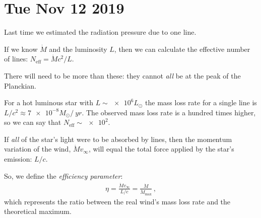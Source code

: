 \documentclass[main.tex]{subfiles}
\begin{document}
\section*{Tue Nov 12 2019}

Last time we estimated the radiation pressure due to one line.

If we know \(\dot{M} \) and the luminosity \(L\), then we can calculate the effective number of  lines: \(N _{\text{eff}} = \dot{M} c^2 / L\).

\begin{bluebox}
There will need to be more than these: they cannot \emph{all} be at the peak of the Planckian. 
\end{bluebox}

For a hot luminous star with \(L \sim \num{e6} L_{\odot}\) the mass loss rate for a single line is \(L/c^2 \approx \num{7e-8} M_{\odot} / \SI{}{yr}\).
The observed mass loss rate is a hundred times higher, so we can say that \(N  _{\text{eff}} \sim \num{e2}\).

If \emph{all} of the star's light were to be absorbed by lines, then the momentum variation of the wind, \(\dot{M} v_{ \infty }\), will equal the total force applied by the star's emission: \(L/c\). 


So, we define the \emph{efficiency parameter}: 
%
\begin{align}
  \eta = \frac{\dot{M} v_{\infty}}{L / c} = \frac{\dot{M}}{\dot{M} _{\text{max}}}
\,,
\end{align}
%
which represents the ratio between the real wind's mass loss rate and the theoretical maximum.
\end{document}
